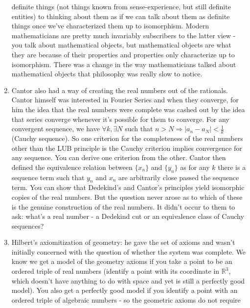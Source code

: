 \documentclass[12pt]{article}
\theoremstyle{definition}
\begin{document}
\begin{enumerate}
        definite things (not things known from sense-experience, but still
        definite entities) to thinking about them as if we can talk about them
        as definite things once we've characterized them up to isomorphism.
        Modern mathematicians are pretty much invariably subscribers to the
        latter view - you talk about mathematical objects, but mathematical
        objects are what they are because of their properties and properties
        only characterize up to isomorphism. There was a change in the way
        mathematicians talked about mathematical objects that philosophy was
        really slow to notice.
    \item
        Cantor also had a way of creating the real numbers out of the
        rationals. Cantor himself was interested in Fourier Series and when
        they converge, for him the idea that the real numbers were complete was
        cashed out by the idea that series converge whenever it's possible for
        them to converge. For any convergent sequence, we have $\forall k,
        \exists N$ such that $n > N \Rightarrow |a_n - a_N| < \frac{1}{k}$
        (Cauchy sequence). So one criterion for the completeness of the real
        numbers other than the LUB principle is the Cauchy criterion implies
        convergence for any sequence. You can derive one criterion from the
        other. Cantor then defined the equivalence relation between $\{x_n\}$
        and $\{y_n\}$ as for any $k$ there is a sequence term such that $y_n$
        and $x_n$ are arbitrarily close passed the sequence term. You can show
        that Dedekind's and Cantor's principles yield isomorphic copies of the
        real numbers. But the question never arose as to which of these is the
        genuine construction of the real numbers. It didn't occur to them to
        ask: what's a real number - a Dedekind cut or an equivalence class of
        Cauchy sequences?
    \item
        Hilbert's axiomitization of geometry: he gave the set of axioms and
        wasn't initially concerned with the question of whether the system was
        complete. We know we get a model of the geometry axioms if you take a
        point to be an ordered triple of real numbers (identify a point with
        its coordinate in $\mathbb{R}^3$, which doesn't have anything to do
        with space and yet is still a perfectly good model). You also get a
        perfectly good model if you identify a point with an ordered triple of
        algebraic numbers - so the geometric axioms do not require

\end{enumerate}
\end{document}
